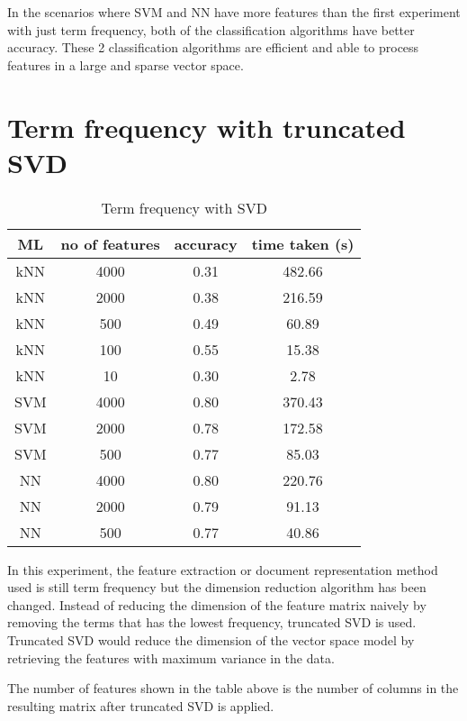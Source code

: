 In the scenarios where SVM and NN have more features than the first experiment with just term frequency, both of the classification algorithms have better accuracy. These 2 classification algorithms are efficient and able to process features in a large and sparse vector space.


\clearpage
\section{Term frequency with truncated SVD}

\begin{table} [ht]
	\centering
	\begin{tabular}{|| c | c | c | c||}
		\hline
		ML & no of features & accuracy & time taken (s) \\ [0.5ex]
		\hline\hline
		kNN & 4000 & 0.31 & 482.66 \\
		\hline
		kNN & 2000 & 0.38 & 216.59 \\ 
		\hline
		kNN & 500 & 0.49 & 60.89 \\ 
		\hline
		kNN & 100 & 0.55 & 15.38 \\ 
		\hline
		kNN & 10 & 0.30 & 2.78 \\ 
		\hline\hline
		SVM & 4000 & 0.80 & 370.43 \\
		\hline
		SVM & 2000 & 0.78 & 172.58 \\
		\hline
		SVM & 500 & 0.77 & 85.03 \\
		\hline\hline
		NN & 4000 & 0.80 & 220.76 \\
		\hline
		NN & 2000 & 0.79 & 91.13 \\
		\hline
		NN & 500 & 0.77 & 40.86 \\
		\hline
	\end{tabular}
\caption{Term frequency with SVD}
\label{tbl:termFrequencySvd}
\end{table}

In this experiment, the feature extraction or document representation method used is still term frequency but the dimension reduction algorithm has been changed. Instead of reducing the dimension of the feature matrix naively by removing the terms that has the lowest frequency, truncated SVD is used. Truncated SVD would reduce the dimension of the vector space model by retrieving the features with maximum variance in the data.

The number of features shown in the table above is the number of columns in the resulting matrix after truncated SVD is applied.

